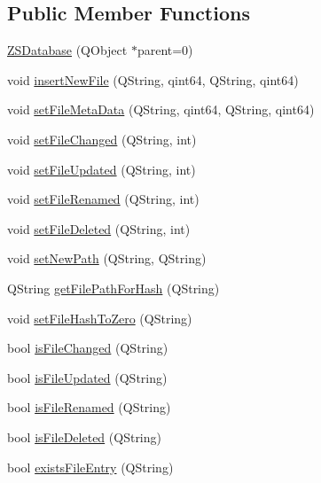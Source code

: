 \subsection*{Public Member Functions}
\begin{DoxyCompactItemize}
\item 
\hyperlink{class_z_s_database_a0627c12fe47bbde3e1170a5af8c184e6}{Z\-S\-Database} (Q\-Object $\ast$parent=0)
\item 
void \hyperlink{class_z_s_database_ac9bbe47e47751f4a414ff490eaa93f37}{insert\-New\-File} (Q\-String, qint64, Q\-String, qint64)
\item 
void \hyperlink{class_z_s_database_ad4a7a82f99dea6cae6eb2984e753e617}{set\-File\-Meta\-Data} (Q\-String, qint64, Q\-String, qint64)
\item 
void \hyperlink{class_z_s_database_abffe5b56804a6ab22c1000823b933457}{set\-File\-Changed} (Q\-String, int)
\item 
void \hyperlink{class_z_s_database_a5f7c4cec7800e5a988aa7655e5d6aba0}{set\-File\-Updated} (Q\-String, int)
\item 
void \hyperlink{class_z_s_database_a2bb1f63e20f29941aaa22d6d45706227}{set\-File\-Renamed} (Q\-String, int)
\item 
void \hyperlink{class_z_s_database_a5d64e9036561661bbfbcead13d80e732}{set\-File\-Deleted} (Q\-String, int)
\item 
void \hyperlink{class_z_s_database_ab48b210e0768ec84a14c495b375f54e9}{set\-New\-Path} (Q\-String, Q\-String)
\item 
Q\-String \hyperlink{class_z_s_database_ad2900311b21e3e04e993b4dcb86b59b3}{get\-File\-Path\-For\-Hash} (Q\-String)
\item 
void \hyperlink{class_z_s_database_a0bed2c815150aa6355872605d2e0fcf5}{set\-File\-Hash\-To\-Zero} (Q\-String)
\item 
bool \hyperlink{class_z_s_database_a065508a7f918f70b815b62ac46b84fc5}{is\-File\-Changed} (Q\-String)
\item 
bool \hyperlink{class_z_s_database_a8956c2e63f50eb34c2a4752111921064}{is\-File\-Updated} (Q\-String)
\item 
bool \hyperlink{class_z_s_database_a73a368af71d0fbed197072462ad22b6b}{is\-File\-Renamed} (Q\-String)
\item 
bool \hyperlink{class_z_s_database_a5a73cbe4cf20c29083b2dd23268fbdc1}{is\-File\-Deleted} (Q\-String)
\item 
bool \hyperlink{class_z_s_database_a9b70013e15474dcaa8eec3cb7eb1e37c}{exists\-File\-Entry} (Q\-String)

\end{DoxyCompactItemize}
